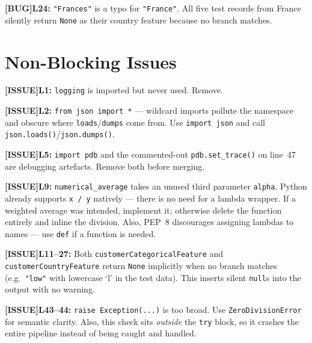 \documentclass{article}
\newcommand{\lineno}[1]{\textbf{L#1:} }
\newcommand{\linesno}[2]{\textbf{L#1--#2:} }
\newcommand{\bug}{\textcolor{red!70!black}{\textbf{[BUG]}}\space}
\newcommand{\issue}{\textcolor{orange!80!black}{\textbf{[ISSUE]}}\space}
\begin{document}
\begin{bugbox}
\bug \lineno{24} \texttt{"Frances"} is a typo for \texttt{"France"}. All five test records from France silently return \texttt{None} as their country feature because no branch matches.
\end{bugbox}

\section{Non-Blocking Issues}

\begin{issuebox}
\issue \lineno{1} \texttt{logging} is imported but never used. Remove.
\end{issuebox}

\begin{issuebox}
\issue \lineno{2} \texttt{from json import *} --- wildcard imports pollute the namespace and obscure where \texttt{loads}/\texttt{dumps} come from. Use \texttt{import json} and call \texttt{json.loads()}/\texttt{json.dumps()}.
\end{issuebox}

\begin{issuebox}
\issue \lineno{5} \texttt{import pdb} and the commented-out \texttt{pdb.set\_trace()} on line~47 are debugging artefacts. Remove both before merging.
\end{issuebox}

\begin{issuebox}
\issue \lineno{9} \texttt{numerical\_average} takes an unused third parameter \texttt{alpha}. Python already supports \texttt{x / y} natively --- there is no need for a lambda wrapper. If a weighted average was intended, implement it; otherwise delete the function entirely and inline the division. Also, PEP~8 discourages assigning lambdas to names --- use \texttt{def} if a function is needed.
\end{issuebox}

\begin{issuebox}
\issue \linesno{11}{27} Both \texttt{customerCategoricalFeature} and \texttt{customerCountryFeature} return \texttt{None} implicitly when no branch matches (e.g.\ \texttt{"low"} with lowercase `l' in the test data). This inserts silent \texttt{null}s into the output with no warning.
\end{issuebox}

\begin{issuebox}
\issue \lineno{43--44} \texttt{raise Exception(...)} is too broad. Use \texttt{ZeroDivisionError} for semantic clarity. Also, this check sits \emph{outside} the \texttt{try} block, so it crashes the entire pipeline instead of being caught and handled.
\end{issuebox}
\end{document}
